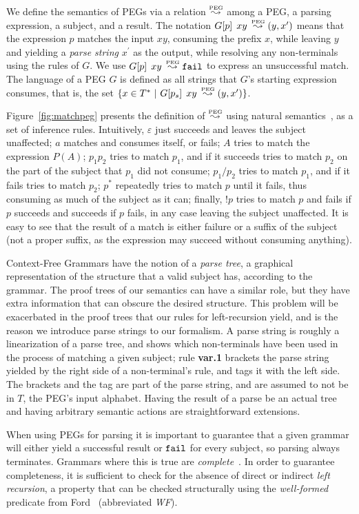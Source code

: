 We define the semantics of PEGs via a relation $\Lp$ among a PEG,
a parsing expression, a subject, and a result. The notation
$\Matg{p}{xy} \Lp \Just{(y,x^\prime)}$ means that the expression $p$
matches the input $xy$, consuming the prefix $x$, while leaving $y$ and
yielding a {\em parse string} $x^\prime$ as the output, while resolving any non-terminals using
the rules of $G$. We use $\Matg{p}{xy} \Lp \Nothing$ to express
an unsuccessful match. The language of a PEG $G$ is defined as all
strings that $G$'s starting expression consumes, that is, the set $\{ x \in T^* \ | \
\Matg{p_s}{xy} \Lp \Just{(y, x^\prime)} \}$.

Figure~\ref{fig:matchpeg} presents the
definition of $\Lp$ using natural semantics~\cite{kahn,winskel}, as a set of inference
rules. Intuitively, $\varepsilon$ just succeeds and leaves the subject
unaffected; $a$ matches and consumes itself, or fails; $A$
tries to match the expression $P(A)$; $p_1p_2$ tries to match $p_1$,
and if it succeeds tries to match $p_2$ on the part of the subject that
$p_1$ did not consume; $p_1 / p_2$ tries to match $p_1$, and if it
fails tries to match $p_2$; $p^*$ repeatedly tries to match $p$ until
it fails, thus consuming as much of the subject as it can; finally, $!p$
tries to match $p$ and fails if $p$ succeeds and succeeds if $p$
fails, in any case leaving the subject unaffected. It is easy to see
that the result of a match is either failure or a suffix of the
subject (not a proper suffix, as the expression may succeed without
consuming anything).

Context-Free Grammars have the notion of a {\em parse tree}, a
graphical representation of the structure that a valid subject has,
according to the grammar. The proof trees of our semantics can have a
similar role, but they have extra information that can obscure the
desired structure. This problem will be exacerbated in the proof trees that our
rules for left-recursion yield, and is the reason we introduce parse strings
 to our formalism. A parse string is roughly a linearization of a
 parse tree, and shows which non-terminals have been used in the
 process of matching a given subject; rule {\bf var.1} brackets the parse
string yielded by the right side of a non-terminal's rule,
and tags it with the left side. The brackets and the tag are part of the parse string,
and are assumed to not be in $T$, the PEG's input alphabet.
Having the result of a parse be an actual tree and having arbitrary semantic actions are
 straightforward extensions.

When using PEGs for parsing it is important to guarantee that a given
grammar will either yield a successful result or $\Nothing$ for every
subject, so parsing always terminates. Grammars where this is true are
{\em complete}~\cite{ford:peg}. In order to guarantee completeness, it
is sufficient to check for the absence of
direct or indirect {\em left recursion}, a property that can be
checked structurally using the {\em well-formed} 
predicate from Ford~\cite{ford:peg} (abbreviated {\em WF}). 

